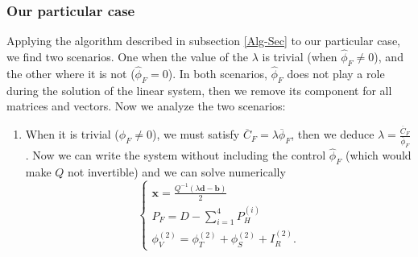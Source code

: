 \documentclass[12pt]{article}
\theoremstyle{definition}
\theoremstyle{remark}
\begin{document}
\subsubsection{Our particular case}

Applying the algorithm described in subsection \ref{Alg-Sec} to our particular case, we find two scenarios. One when the value of the $\lambda$ is trivial (when $\hat{\phi}_F\neq0$), and the other where it is not ($\hat{\phi}_F=0$). In both scenarios, $\hat{\phi}_F$ does not play a role during the solution of the linear system, then we remove its component for all matrices and vectors. Now we analyze the two scenarios:
\begin{enumerate}

\item When it is trivial ($\hat{\phi}_F\neq0$), we must satisfy $\overline{C}_F=\lambda\overline{\phi}_F$, then we deduce $\lambda=\frac{\overline{C}_F}{\overline{\phi}_F}$. Now we can write the system without including the control $\hat{\phi}_F$ (which would make $Q$ not invertible) and we can solve numerically
\begin{equation*}
\begin{cases}
\bm{x}=\frac{Q^{-1}(\lambda\bm{d}-\bm{b})}{2}\\
P_F=D-\sum_{i=1}^4P_H^{(i)}\\
\phi_V^{(2)}=\phi_T^{(2)}+\phi_S^{(2)}+I_R^{(2)}.\end{cases}
\end{equation*}


\end{enumerate}
\end{document}
